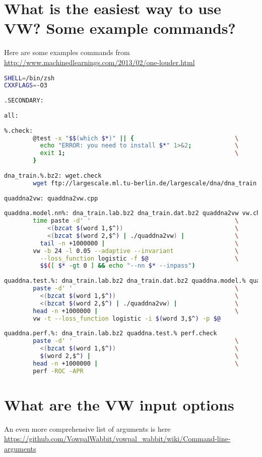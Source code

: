 \documentclass[preview,border={30 30 30 30}]{standalone}
\begin{document}
\section{What is the easiest way to use VW? Some example commands?}

Here are some examples commands from \url{http://www.machinedlearnings.com/2013/02/one-louder.html}

\begin{lstlisting}[language=bash]
% less Makefile
SHELL=/bin/zsh
CXXFLAGS=-O3
 
.SECONDARY:
 
all:
 
%.check:
        @test -x "$$(which $*)" || {                            \
          echo "ERROR: you need to install $*" 1>&2;            \
          exit 1;                                               \
        }
 
dna_train.%.bz2: wget.check
        wget ftp://largescale.ml.tu-berlin.de/largescale/dna/dna_train.$*.bz2
 
quaddna2vw: quaddna2vw.cpp
 
quaddna.model.nn%: dna_train.lab.bz2 dna_train.dat.bz2 quaddna2vw vw.check
        time paste -d' '                                        \
            <(bzcat $(word 1,$^))                               \
            <(bzcat $(word 2,$^) | ./quaddna2vw) |              \
          tail -n +1000000 |                                    \
        vw -b 24 -l 0.05 --adaptive --invariant                 \
          --loss_function logistic -f $@                        \
          $$([ $* -gt 0 ] && echo "--nn $* --inpass")
 
quaddna.test.%: dna_train.lab.bz2 dna_train.dat.bz2 quaddna.model.% quaddna2vw vw.check
        paste -d' '                                             \
          <(bzcat $(word 1,$^))                                 \
          <(bzcat $(word 2,$^) | ./quaddna2vw) |                \
        head -n +1000000 |                                      \
        vw -t --loss_function logistic -i $(word 3,$^) -p $@
 
quaddna.perf.%: dna_train.lab.bz2 quaddna.test.% perf.check
        paste -d' '                                             \
          <(bzcat $(word 1,$^))                                 \
          $(word 2,$^) |                                        \
        head -n +1000000 |                                      \
        perf -ROC -APR
\end{lstlisting}
\section{What are the VW input options}
An even more comprehensive list of arguments is here \url{https://github.com/VowpalWabbit/vowpal_wabbit/wiki/Command-line-arguments}
\end{document}
